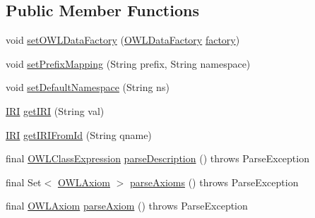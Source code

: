 \subsection*{Public Member Functions}
\begin{DoxyCompactItemize}
\item 
void \hyperlink{classuk_1_1ac_1_1manchester_1_1cs_1_1owlapi_1_1dlsyntax_1_1parser_1_1_d_l_syntax_parser_a4a3e4ee9443524f0dbeba22099d53ddc}{set\-O\-W\-L\-Data\-Factory} (\hyperlink{interfaceorg_1_1semanticweb_1_1owlapi_1_1model_1_1_o_w_l_data_factory}{O\-W\-L\-Data\-Factory} \hyperlink{classuk_1_1ac_1_1manchester_1_1cs_1_1owlapi_1_1dlsyntax_1_1parser_1_1_d_l_syntax_parser_aa75acc1543de76f070892e9b73620936}{factory})
\item 
void \hyperlink{classuk_1_1ac_1_1manchester_1_1cs_1_1owlapi_1_1dlsyntax_1_1parser_1_1_d_l_syntax_parser_a8e5f9fad7ae1eb8ee16f51364200e931}{set\-Prefix\-Mapping} (String prefix, String namespace)
\item 
void \hyperlink{classuk_1_1ac_1_1manchester_1_1cs_1_1owlapi_1_1dlsyntax_1_1parser_1_1_d_l_syntax_parser_a32f4b295971f4fd1c6306afd71424953}{set\-Default\-Namespace} (String ns)
\item 
\hyperlink{classorg_1_1semanticweb_1_1owlapi_1_1model_1_1_i_r_i}{I\-R\-I} \hyperlink{classuk_1_1ac_1_1manchester_1_1cs_1_1owlapi_1_1dlsyntax_1_1parser_1_1_d_l_syntax_parser_a057f0fc4222fddc7a85dc96988e26031}{get\-I\-R\-I} (String val)
\item 
\hyperlink{classorg_1_1semanticweb_1_1owlapi_1_1model_1_1_i_r_i}{I\-R\-I} \hyperlink{classuk_1_1ac_1_1manchester_1_1cs_1_1owlapi_1_1dlsyntax_1_1parser_1_1_d_l_syntax_parser_ad09214f23dfbc295d6dbe6fa5d286a4a}{get\-I\-R\-I\-From\-Id} (String qname)
\item 
final \hyperlink{interfaceorg_1_1semanticweb_1_1owlapi_1_1model_1_1_o_w_l_class_expression}{O\-W\-L\-Class\-Expression} \hyperlink{classuk_1_1ac_1_1manchester_1_1cs_1_1owlapi_1_1dlsyntax_1_1parser_1_1_d_l_syntax_parser_a61a2bf6c9384b68b4bb4a4f79405eb14}{parse\-Description} ()  throws Parse\-Exception 
\item 
final Set$<$ \hyperlink{interfaceorg_1_1semanticweb_1_1owlapi_1_1model_1_1_o_w_l_axiom}{O\-W\-L\-Axiom} $>$ \hyperlink{classuk_1_1ac_1_1manchester_1_1cs_1_1owlapi_1_1dlsyntax_1_1parser_1_1_d_l_syntax_parser_a3442f8d9199d05b1e31931c18f48b701}{parse\-Axioms} ()  throws Parse\-Exception 
\item 
final \hyperlink{interfaceorg_1_1semanticweb_1_1owlapi_1_1model_1_1_o_w_l_axiom}{O\-W\-L\-Axiom} \hyperlink{classuk_1_1ac_1_1manchester_1_1cs_1_1owlapi_1_1dlsyntax_1_1parser_1_1_d_l_syntax_parser_a4301d5d0231031866b1e74f2d65c2466}{parse\-Axiom} ()  throws Parse\-Exception 

\end{DoxyCompactItemize}
